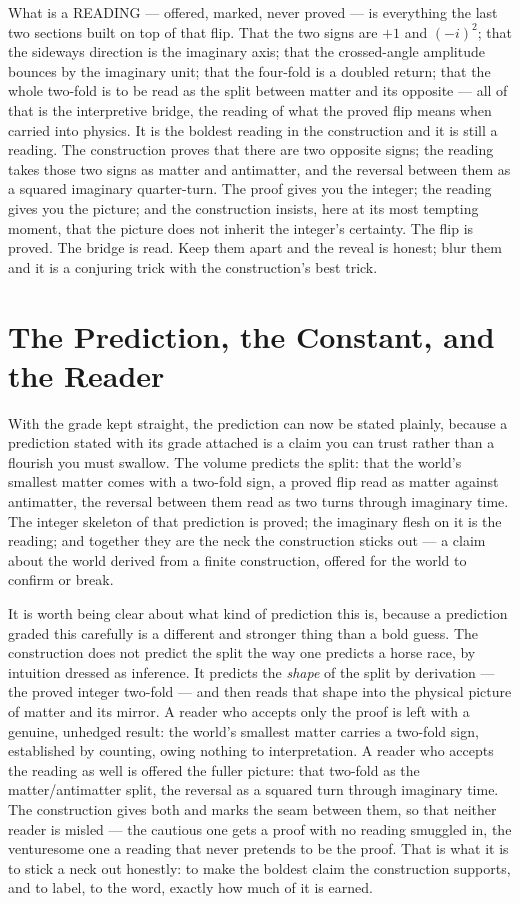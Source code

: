 What is a READING --- offered, marked, never proved --- is everything the last two sections built on top of that
flip. That the two signs are $+1$ and $(-i)^2$; that the sideways direction is the imaginary axis; that the
crossed-angle amplitude bounces by the imaginary unit; that the four-fold is a doubled return; that the whole
two-fold is to be read as the split between matter and its opposite --- all of that is the interpretive bridge,
the reading of what the proved flip means when carried into physics. It is the boldest reading in the construction and
it is still a reading. The construction proves that there are two opposite signs; the reading takes those two
signs as matter and antimatter, and the reversal between them as a squared imaginary quarter-turn. The proof
gives you the integer; the reading gives you the picture; and the construction insists, here at its most tempting
moment, that the picture does not inherit the integer's certainty. The flip is proved. The bridge is read. Keep
them apart and the reveal is honest; blur them and it is a conjuring trick with the construction's best trick.

\section{The Prediction, the Constant, and the Reader}

With the grade kept straight, the prediction can now be stated plainly, because a prediction stated with its
grade attached is a claim you can trust rather than a flourish you must swallow. The volume predicts the split: that the
world's smallest matter comes with a two-fold sign, a proved flip read as matter against antimatter, the reversal
between them read as two turns through imaginary time. The integer skeleton of that prediction is proved; the
imaginary flesh on it is the reading; and together they are the neck the construction sticks out --- a claim
about the world derived from a finite construction, offered for the world to confirm or break.

It is worth being clear about what kind of prediction this is, because a prediction graded this carefully is a
different and stronger thing than a bold guess. The construction does not predict the split the way one predicts a horse
race, by intuition dressed as inference. It predicts the \emph{shape} of the split by derivation --- the proved
integer two-fold --- and then reads that shape into the physical picture of matter and its mirror. A reader who
accepts only the proof is left with a genuine, unhedged result: the world's smallest matter carries a two-fold
sign, established by counting, owing nothing to interpretation. A reader who accepts the reading as well is offered
the fuller picture: that two-fold as the matter/antimatter split, the reversal as a squared turn through imaginary
time. The construction gives both and marks the seam between them, so that neither reader is misled --- the cautious one
gets a proof with no reading smuggled in, the venturesome one a reading that never pretends to be the proof. That
is what it is to stick a neck out honestly: to make the boldest claim the construction supports, and to label, to
the word, exactly how much of it is earned.

